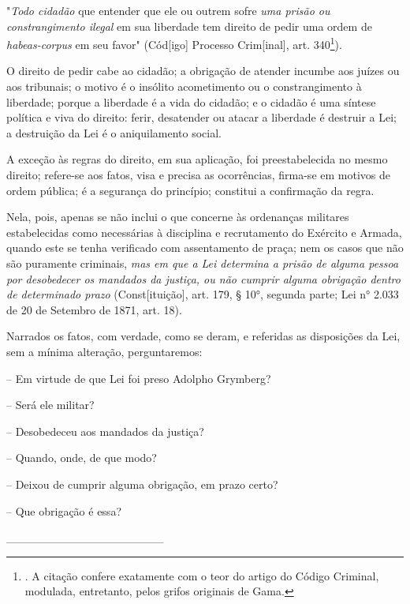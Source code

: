 "\emph{Todo cidadão} que entender que ele ou outrem sofre \emph{uma
prisão ou constrangimento ilegal} em sua liberdade tem direito de pedir
uma ordem de \emph{habeas-corpus} em seu favor" (Cód{[}igo{]} Processo
Crim{[}inal{]}, art. 340\footnote{. A citação confere exatamente com o
  teor do artigo do Código Criminal, modulada, entretanto, pelos grifos
  originais de Gama.}).

O direito de pedir cabe ao cidadão; a obrigação de atender incumbe aos
juízes ou aos tribunais; o motivo é o insólito acometimento ou o
constrangimento à liberdade; porque a liberdade é a vida do cidadão; e o
cidadão é uma síntese política e viva do direito: ferir, desatender ou
atacar a liberdade é destruir a Lei; a destruição da Lei é o
aniquilamento social.

A exceção às regras do direito, em sua aplicação, foi preestabelecida no
mesmo direito; refere-se aos fatos, visa e precisa as ocorrências,
firma-se em motivos de ordem pública; é a segurança do princípio;
constitui a confirmação da regra.

Nela, pois, apenas se não inclui o que concerne às ordenanças militares
estabelecidas como necessárias à disciplina e recrutamento do Exército e
Armada, quando este se tenha verificado com assentamento de praça; nem
os casos que não são puramente criminais, \emph{mas em que a Lei
determina a prisão de alguma pessoa por desobedecer os mandados da
justiça, ou não cumprir alguma obrigação dentro de determinado prazo}
(Const{[}ituição{]}, art. 179, § 10°, segunda parte; Lei n° 2.033 de 20
de Setembro de 1871, art. 18).

Narrados os fatos, com verdade, como se deram, e referidas as
disposições da Lei, sem a mínima alteração, perguntaremos:

-- Em virtude de que Lei foi preso Adolpho Grymberg?

-- Será ele militar?

-- Desobedeceu aos mandados da justiça?

-- Quando, onde, de que modo?

-- Deixou de cumprir alguma obrigação, em prazo certo?

-- Que obrigação é essa?

\_\_\_\_\_\_\_\_\_\_\_\_\_\_\_\_\_\_\_

